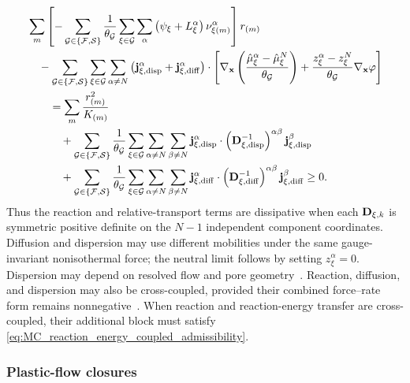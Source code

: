 \begin{align}
	 & \sum_m
	\left[
		-
		\sum_{\mathcal{G}\in\{\mathcal{F},\mathcal{S}\}}
			\frac{1}{\theta_{\mathcal{G}}}
			\sum_{\xi\in\mathcal{G}}\sum_\alpha
			\left(
			\psi_\xi+L_\xi^\alpha
			\right)
		\nu_{\xi (m)}^\alpha
		\right]r_{(m)}
	\notag \\
	 & \quad -
	\sum_{\mathcal{G}\in\{\mathcal{F},\mathcal{S}\}}
	\sum_{\xi\in\mathcal{G}}\sum_{\alpha\ne N}
	\left(
	\mathbf{j}_{\xi,{\rm disp}}^\alpha
	+
	\mathbf{j}_{\xi,{\rm diff}}^\alpha
	\right)\cdot
	\left[
		\nabla_{\mathbf{x}}
		\left(
			\frac{
				\hat\mu_\xi^\alpha-\hat\mu_\xi^N
			}{\theta_{\mathcal{G}}}
		\right)
		+
		\frac{
			z_\xi^\alpha-z_\xi^N
		}{\theta_{\mathcal{G}}}
		\nabla_{\mathbf{x}}\varphi
	\right]
	\notag           \\
	 & \qquad=
	\sum_m
	\frac{r_{(m)}^2}{K_{(m)}}
	\notag           \\
	 & \qquad\quad +
	\sum_{\mathcal{G}\in\{\mathcal{F},\mathcal{S}\}}
	\frac{1}{\theta_{\mathcal{G}}}
	\sum_{\xi\in\mathcal{G}}
	\sum_{\alpha\ne N}\sum_{\beta\ne N}
	\mathbf{j}_{\xi,{\rm disp}}^\alpha
	\cdot
	\left(\mathbf{D}_{\xi,{\rm disp}}^{-1}\right)^{\alpha\beta}
	\mathbf{j}_{\xi,{\rm disp}}^\beta
	\notag           \\
	 & \qquad\quad +
	\sum_{\mathcal{G}\in\{\mathcal{F},\mathcal{S}\}}
	\frac{1}{\theta_{\mathcal{G}}}
	\sum_{\xi\in\mathcal{G}}
	\sum_{\alpha\ne N}\sum_{\beta\ne N}
	\mathbf{j}_{\xi,{\rm diff}}^\alpha
	\cdot
	\left(\mathbf{D}_{\xi,{\rm diff}}^{-1}\right)^{\alpha\beta}
	\mathbf{j}_{\xi,{\rm diff}}^\beta
	\ge0.
	\label{eq:MC_onsager_reaction_transport_dissipation}
\end{align}
%
Thus the reaction and relative-transport terms are dissipative when each
\(\mathbf{D}_{\xi,k}\) is symmetric positive definite on the \(N-1\) independent
component coordinates.  Diffusion and dispersion may use different mobilities
under the same gauge-invariant nonisothermal force; the neutral limit follows by
setting \(z_\xi^\alpha=0\).  Dispersion may depend on resolved flow
and pore geometry~\cite{plumb1988dispersion,gray2009tcat_transport}.  Reaction,
diffusion, and dispersion may also be cross-coupled, provided their combined
force--rate form remains nonnegative~\cite{doi2011onsager,wang2021onsager}.
When reaction and reaction-energy transfer are cross-coupled, their additional
block must satisfy
\eqref{eq:MC_reaction_energy_coupled_admissibility}.

\subsubsection{Plastic-flow closures}
\label{sec:MC_plastic_flow_closures}

